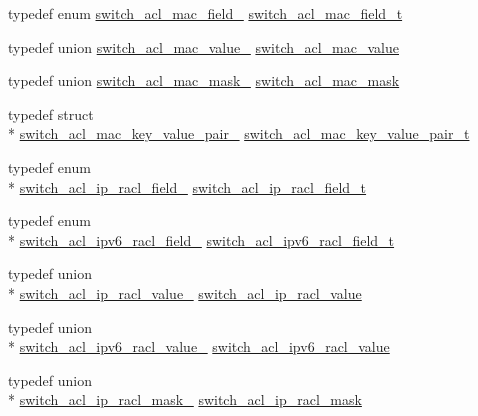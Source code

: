 \begin{DoxyCompactItemize}
\item 
typedef enum \hyperlink{group__ACL_ga015960fbc5601ee7b35606ea8471dac3}{switch\+\_\+acl\+\_\+mac\+\_\+field\+\_\+} \hyperlink{group__ACL_gabee0fa282b10d53d4536c60d8f71c959}{switch\+\_\+acl\+\_\+mac\+\_\+field\+\_\+t}
\item 
typedef union \hyperlink{unionswitch__acl__mac__value__}{switch\+\_\+acl\+\_\+mac\+\_\+value\+\_\+} \hyperlink{group__ACL_gaebafd1394ccbcc5e09ad753cd6823e1d}{switch\+\_\+acl\+\_\+mac\+\_\+value}
\item 
typedef union \hyperlink{unionswitch__acl__mac__mask__}{switch\+\_\+acl\+\_\+mac\+\_\+mask\+\_\+} \hyperlink{group__ACL_ga77cb290b807499a0fe9a32ef3095fee4}{switch\+\_\+acl\+\_\+mac\+\_\+mask}
\item 
typedef struct \\*
\hyperlink{structswitch__acl__mac__key__value__pair__}{switch\+\_\+acl\+\_\+mac\+\_\+key\+\_\+value\+\_\+pair\+\_\+} \hyperlink{group__ACL_ga83b60ce501cedbd87a0d36a6cb01ff57}{switch\+\_\+acl\+\_\+mac\+\_\+key\+\_\+value\+\_\+pair\+\_\+t}
\item 
typedef enum \\*
\hyperlink{group__ACL_gaf0f1f49088b56fbe530ae19b8db6b4fb}{switch\+\_\+acl\+\_\+ip\+\_\+racl\+\_\+field\+\_\+} \hyperlink{group__ACL_gab3c32093eb5fc25f4a3d5b17a13dcfcf}{switch\+\_\+acl\+\_\+ip\+\_\+racl\+\_\+field\+\_\+t}
\item 
typedef enum \\*
\hyperlink{group__ACL_gabaf09e557bd1549a5197e9d4c77d4f8c}{switch\+\_\+acl\+\_\+ipv6\+\_\+racl\+\_\+field\+\_\+} \hyperlink{group__ACL_ga8b0c0741dee8773a26a38c9de04bce86}{switch\+\_\+acl\+\_\+ipv6\+\_\+racl\+\_\+field\+\_\+t}
\item 
typedef union \\*
\hyperlink{unionswitch__acl__ip__racl__value__}{switch\+\_\+acl\+\_\+ip\+\_\+racl\+\_\+value\+\_\+} \hyperlink{group__ACL_gaa75a5830dc886595aa7a32418cc610ff}{switch\+\_\+acl\+\_\+ip\+\_\+racl\+\_\+value}
\item 
typedef union \\*
\hyperlink{unionswitch__acl__ipv6__racl__value__}{switch\+\_\+acl\+\_\+ipv6\+\_\+racl\+\_\+value\+\_\+} \hyperlink{group__ACL_gabd4501c34aa02ce20e75ca0adec4d446}{switch\+\_\+acl\+\_\+ipv6\+\_\+racl\+\_\+value}
\item 
typedef union \\*
\hyperlink{unionswitch__acl__ip__racl__mask__}{switch\+\_\+acl\+\_\+ip\+\_\+racl\+\_\+mask\+\_\+} \hyperlink{group__ACL_ga575e03af8cd2193f5713be9ce8931c01}{switch\+\_\+acl\+\_\+ip\+\_\+racl\+\_\+mask}

\end{DoxyCompactItemize}
